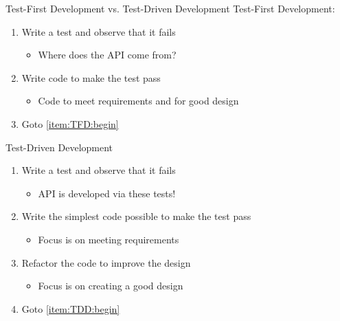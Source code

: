 \documentclass{beamer}
\begin{document}
\begin{frame}{Test-First Development vs. Test-Driven Development}
Test-First Development:
\begin{enumerate}
\item\label{item:TFD:begin} Write a test and observe that it fails
\begin{itemize}
\item Where does the API come from?
\end{itemize}
\item Write code to make the test pass
\begin{itemize}
\item Code to meet requirements and for good design
\end{itemize}
\item Goto \ref{item:TFD:begin}
\end{enumerate}

\bigskip
\pause
Test-Driven Development
\begin{enumerate}
\item\label{item:TDD:begin} Write a test and observe that it fails
\begin{itemize}
\item API is developed via these tests!
\end{itemize}
\item Write the simplest code possible to make the test pass
\begin{itemize}
\item Focus is on meeting requirements
\end{itemize}
\item Refactor the code to improve the design
\begin{itemize}
\item Focus is on creating a good design
\end{itemize}
\item Goto \ref{item:TDD:begin}
\end{enumerate}
\end{frame}
\end{document}
